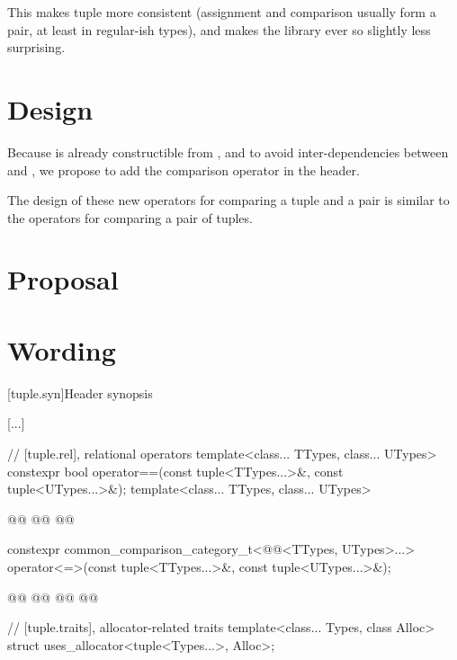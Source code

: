 \documentclass{wg21}
\begin{document}
This makes tuple more consistent (assignment and comparison usually form a pair, at least in regular-ish types),
and makes the library ever so slightly less surprising.
 
\section{Design}

Because  is already constructible from , and to avoid inter-dependencies between  and , 
we propose to add the comparison operator  in the  header.

The design of these new operators for comparing a tuple and a pair is similar 
to the operators for comparing a pair of tuples.  

\section{Proposal}


\section{Wording}


[tuple.syn]{Header  synopsis}

[...]
\begin{codeblock}

// [tuple.rel], relational operators
template<class... TTypes, class... UTypes>
constexpr bool operator==(const tuple<TTypes...>&, const tuple<UTypes...>&);
template<class... TTypes, class... UTypes>

@@
@@
@@

constexpr common_comparison_category_t<@@<TTypes, UTypes>...>
operator<=>(const tuple<TTypes...>&, const tuple<UTypes...>&);

@@
@@
@@
@@

// [tuple.traits], allocator-related traits
template<class... Types, class Alloc>
struct uses_allocator<tuple<Types...>, Alloc>;
\end{codeblock}
\end{document}
